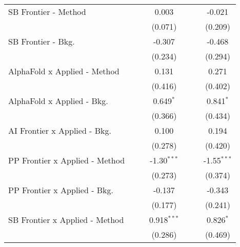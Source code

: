\begin{tabular}{lcccccc}
   SB Frontier - Method           &             &             & 0.003         &              &               & -0.021\\   
                                  &             &             & (0.071)       &              &               & (0.209)\\   
   SB Frontier - Bkg.             &             &             & -0.307        &              &               & -0.468\\   
                                  &             &             & (0.234)       &              &               & (0.294)\\   
   AlphaFold x Applied - Method   &             &             & 0.131         &              &               & 0.271\\   
                                  &             &             & (0.416)       &              &               & (0.402)\\   
   AlphaFold x Applied - Bkg.     &             &             & 0.649$^{*}$   &              &               & 0.841$^{*}$\\   
                                  &             &             & (0.366)       &              &               & (0.434)\\   
   AI Frontier x Applied - Bkg.   &             &             & 0.100         &              &               & 0.194\\   
                                  &             &             & (0.278)       &              &               & (0.420)\\   
   PP Frontier x Applied - Method &             &             & -1.30$^{***}$ &              &               & -1.55$^{***}$\\   
                                  &             &             & (0.273)       &              &               & (0.374)\\   
   PP Frontier x Applied - Bkg.   &             &             & -0.137        &              &               & -0.343\\   
                                  &             &             & (0.177)       &              &               & (0.241)\\   
   SB Frontier x Applied - Method &             &             & 0.918$^{***}$ &              &               & 0.826$^{*}$\\   
                                  &             &             & (0.286)       &              &               & (0.469)\\   

\end{tabular}

